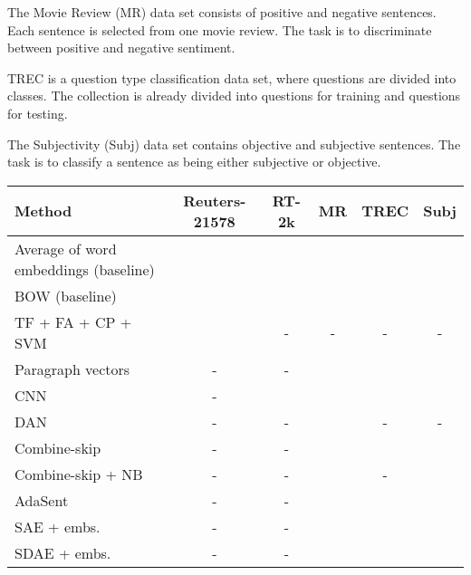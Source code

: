 \documentclass[11pt,a4paper]{article}
\begin{document}
The Movie Review (MR) data set \cite{Pang-ACL-2005} consists of  positive and  negative sentences. Each sentence is selected from one movie review. The task is to discriminate between positive and negative sentiment.

TREC \cite{Li-COLING-2002} is a question type classification data set, where questions are divided into  classes. The collection is already divided into  questions for training and  questions for testing.

The Subjectivity (Subj) \cite{Pang-ACL-2004} data set contains  objective and  subjective sentences. The task is to classify a sentence as being either subjective or objective.

\begin{table*}[!t]
\setlength\tabcolsep{5.5pt}
\begin{center}
\begin{tabular}{lccccc}
\hline
Method 											& Reuters-21578 	& RT-2k				&	MR					& TREC					& Subj \\
\hline
\hline
Average of word embeddings (baseline) 	&  		&  				& 				& 				& \\
BOW (baseline) 								&  				&  				& 				& 				& \\
\hline
TF + FA + CP + SVM \cite{Xue-TKDE-2009}	& 	& - 	& - 						& -						& -\\
														
Paragraph vectors \cite{Le-ICML-2014}		& - 				& - 						&  				& 				& \\
															
CNN \cite{Kim-EMNLP-2014}			& - 						&  				& 				&  				& \\

DAN \cite{Iyyer-ACL-2015}						& - 				& - 						&  				& -						& -\\

Combine-skip \cite{Kiros-NIPS-2015}	& - 					& - 						&  				& 				& \\

Combine-skip + NB \cite{Kiros-NIPS-2015}	& - 			& - 						&  				& -						& \\

AdaSent \cite{Zhao-IJCAI-2015}		& -						& - 						&  				& 				& \\

SAE + embs. \cite{Hill-NAACL-2016}		& - 					& - 						&  				& 				& \\

SDAE + embs. \cite{Hill-NAACL-2016}	& - 					& - 						&  				& 				& \\


\end{tabular}
\end{center}
\end{table*}
\end{document}

